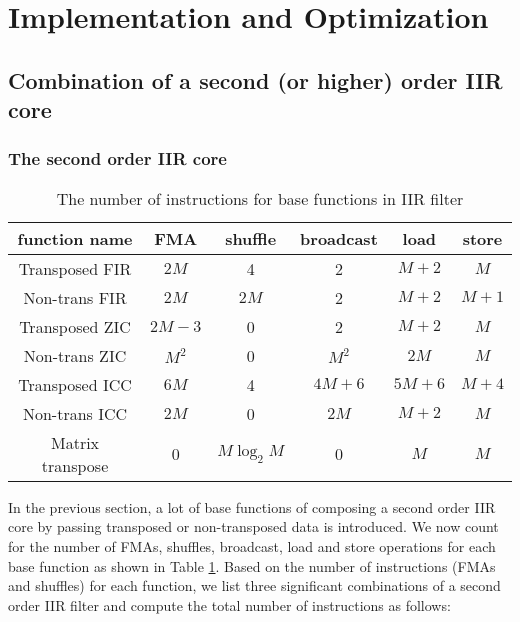 \section{Implementation and Optimization}
\label{sec:implementation}

\subsection{Combination of a second (or higher) order IIR core}

\subsubsection{The second order IIR core}

\begin{table}[t]
    \caption{The number of instructions for base functions in IIR filter}  %
    \centering %
    \begin{tabular}{c c c c c c} %
    \hline\hline %
    function name & FMA & shuffle & broadcast & load & store \\ [1ex] %
    \hline %
    Transposed FIR & $2M$ & 4 & 2 & $M{+}2$ & $M$ \\ [0.3ex]
    Non-trans FIR & $2M$ & $2M$ & 2 & $M{+}2$ & $M{+}1$ \\ [0.3ex]
    Transposed ZIC & $2M{-}3$ & 0 & 2 & $M{+}2$ & $M$ \\ [0.3ex]
    Non-trans ZIC & $M^2$ & 0 & $M^2$ & $2M$ & $M$ \\ [0.3ex]
    Transposed ICC & $6M$ & 4 & $4M{+}6$ & $5M{+}6$ & $M{+}4$ \\ [0.3ex]
    Non-trans ICC & $2M$ & 0 & $2M$ & $M{+}2$ & $M$ \\ [0.3ex]
    Matrix transpose & 0 & $M{\log_2}M$ & 0 & $M$ & $M$ \\ [1ex]
    \hline
    \end{tabular}
    \label{table:number_of_instructions} %
\end{table}

In the previous section, a lot of base functions of composing a second order IIR core by passing transposed or non-transposed data is introduced.
We now count for the number of FMAs, shuffles, broadcast, load and store operations for each base function
as shown in Table \ref{table:number_of_instructions}. Based on the number of instructions (FMAs and shuffles) for each function,
we list three significant combinations of a second order IIR filter and compute the total number of instructions as follows: 

